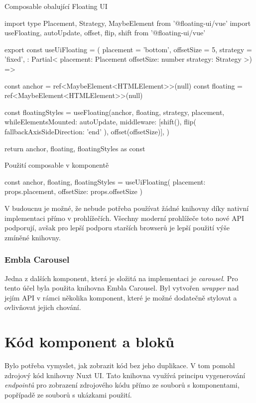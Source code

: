 \begin{listing}[H]
    \caption{Composable obalující Floating UI}
    \label{lst:floating-ui}
    \begin{code}
import type { Placement, Strategy, MaybeElement } from '@floating-ui/vue'
import { useFloating, autoUpdate, offset, flip, shift } from '@floating-ui/vue'

export const useUiFloating = ({
  placement = 'bottom',
  offsetSize = 5,
  strategy = 'fixed',
}: Partial<{
  placement: Placement
  offsetSize: number
  strategy: Strategy
}>) => {
  const anchor = ref<MaybeElement<HTMLElement>>(null)
  const floating = ref<MaybeElement<HTMLElement>>(null)

  const { floatingStyles } = useFloating(anchor, floating, {
    strategy,
    placement,
    whileElementsMounted: autoUpdate,
    middleware: [shift(), flip({ fallbackAxisSideDirection: 'end' }), offset(offsetSize)],
  })

  return { anchor, floating, floatingStyles } as const
}
\end{code}
\end{listing}

\begin{listing}[H]
    \caption{Použití composable v komponentě}
    \label{lst:floating-ui-usage}
    \begin{code}
const { anchor, floating, floatingStyles } = useUiFloating({ placement: props.placement, offsetSize: props.offsetSize })
\end{code}
\end{listing}

V budoucnu je možné, že nebude potřeba používat žádné knihovny díky nativní implementaci přímo v prohlížečích. Všechny moderní prohlížeče toto nové API podporují, avšak pro lepší podporu starších browserů je lepší použití výše zmíněné knihovny. \cite{PopoverAPI}

\subsubsection{Embla Carousel}
Jedna z dalších komponent, která je složitá na implementaci je \emph{carousel}. Pro tento účel byla použita knihovna Embla Carousel. Byl vytvořen \emph{wrapper} nad jejím API v rámci několika komponent, které je možné dodatečně stylovat a ovlivňovat jejich chování.

\clearpage

\section{Kód komponent a bloků}
Bylo potřeba vymyslet, jak zobrazit kód bez jeho duplikace. V tom pomohl zdrojový kód knihovny Nuxt UI. Tato knihovna využívá principu vygenerování \emph{endpointů} pro zobrazení zdrojového kódu přímo ze souborů s komponentami, popřípadě ze souborů s ukázkami použití. \cite{NuxtUISourceCodeModule}

